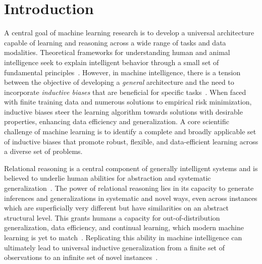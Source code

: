 \section{Introduction}\label{sec:intro}

A central goal of machine learning research is to develop a universal architecture capable of learning and reasoning across a wide range of tasks and data modalities. Theoretical frameworks for understanding human and animal intelligence seek to explain intelligent behavior through a small set of fundamental principles~\citep{marcus2003algebraic}. However, in machine intelligence, there is a tension between the objective of developing a \textit{general} architecture and the need to incorporate \textit{inductive biases} that are beneficial for specific tasks~\citep{wolpert1995no,baxter2000model}. When faced with finite training data and numerous solutions to empirical risk minimization, inductive biases steer the learning algorithm towards solutions with desirable properties, enhancing data efficiency and generalization.
A core scientific challenge of machine learning is to identify a complete and broadly applicable set of inductive biases that promote robust, flexible, and data-efficient learning across a diverse set of problems.

Relational reasoning is a central component of generally intelligent systems and is believed to underlie human abilities for abstraction and systematic generalization~\citep{gentner1983structure,snow1984topography,kemp2008discovery,holyoak2012analogy}. The power of relational reasoning lies in its capacity to generate inferences and generalizations in systematic and novel ways, even across instances which are superficially very different but have similarities on an abstract structural level. This grants humans a capacity for out-of-distribution generalization, data efficiency, and continual learning, which modern machine learning is yet to match~\citep{lake2017building,smith2019promise,nogueira2021investigatinglimitationstransformerssimple}. Replicating this ability in machine intelligence can ultimately lead to universal inductive generalization from a finite set of observations to an infinite set of novel instances~\citep{goyal2022inductive}.

